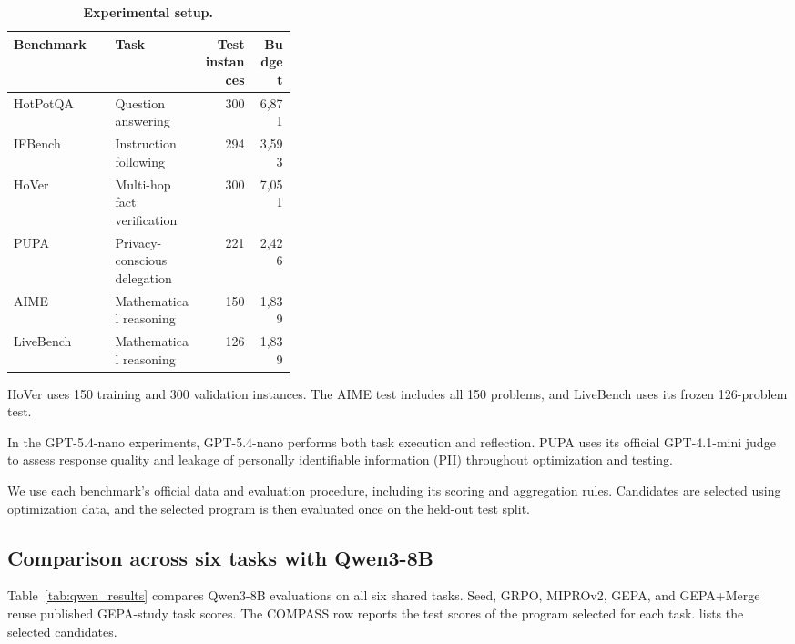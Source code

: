 \begin{table}[H]
\caption{\textbf{Experimental setup.}}
\label{tab:experiment_setup}
\centering
\small
\setlength{\tabcolsep}{3pt}
\renewcommand{\arraystretch}{1.12}
\begin{tabularx}{\linewidth}{@{}>{\raggedright\arraybackslash}p{0.36\linewidth}>{\raggedright\arraybackslash}Xrr@{}}
\toprule
Benchmark & Task & Test instances & Budget \\
\midrule
HotPotQA~\citep{hotpotqa_bench} & Question answering & 300 & 6,871 \\
IFBench~\citep{ifbench_bench} & Instruction following & 294 & 3,593 \\
HoVer~\citep{hover_bench} & Multi-hop fact verification & 300 & 7,051 \\
PUPA~\citep{papillon_bench} & Privacy-conscious delegation & 221 & 2,426 \\
AIME~\citep{aime_2025} & Mathematical reasoning & 150 & 1,839 \\
LiveBench~\citep{livebench} & Mathematical reasoning & 126 & 1,839 \\
\bottomrule
\end{tabularx}
\par\smallskip
\begin{minipage}{\linewidth}
HoVer uses 150 training and 300 validation instances.  The AIME test
includes all 150 problems, and LiveBench uses its frozen 126-problem test.
\end{minipage}
\end{table}

In the GPT-5.4-nano experiments, GPT-5.4-nano performs both task execution and
reflection.  PUPA uses its official GPT-4.1-mini judge to assess response
quality and leakage of personally identifiable information (PII) throughout
optimization and testing.

We use each benchmark's official data and evaluation procedure, including its
scoring and aggregation rules.  Candidates are selected using optimization
data, and the selected program is then evaluated once on the held-out test
split.

\subsection{Comparison across six tasks with Qwen3-8B}

Table~\ref{tab:qwen_results} compares Qwen3-8B evaluations on all six shared
tasks.  Seed, GRPO, MIPROv2, GEPA, and GEPA+Merge reuse published GEPA-study
task scores.  The COMPASS row reports the test scores of the program selected
for each task.   lists the selected candidates.

